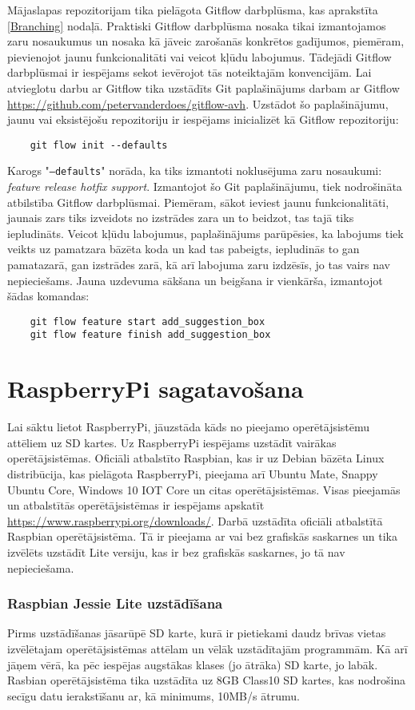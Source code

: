 Mājaslapas repozitorijam tika pielāgota Gitflow darbplūsma, kas aprakstīta \ref{Branching} nodaļā. Praktiski Gitflow darbplūsma nosaka tikai izmantojamos zaru nosaukumus un nosaka kā jāveic zarošanās konkrētos gadījumos, piemēram, pievienojot jaunu funkcionalitāti vai veicot kļūdu labojumus. Tādejādi Gitflow darbplūsmai ir iespējams sekot ievērojot tās noteiktajām konvencijām. Lai atvieglotu darbu ar Gitflow tika uzstādīts Git paplašinājums darbam ar Gitflow \url{https://github.com/petervanderdoes/gitflow-avh}. Uzstādot šo paplašinājumu, jaunu vai eksistējošu repozitoriju ir iespējams inicializēt kā Gitflow repozitoriju:
\begin{lstlisting}
	git flow init --defaults
\end{lstlisting}
Karogs "\texttt{--defaults}" norāda, ka tiks izmantoti noklusējuma zaru nosaukumi: \textit{feature release hotfix support}. Izmantojot šo Git paplašinājumu, tiek nodrošināta atbilstība Gitflow darbplūsmai. Piemēram, sākot ieviest jaunu funkcionalitāti, jaunais zars tiks izveidots no izstrādes zara un to beidzot, tas tajā tiks iepludināts. Veicot kļūdu labojumus, paplašinājums parūpēsies, ka labojums tiek veikts uz pamatzara bāzēta koda un kad tas pabeigts, iepludinās to gan pamatazarā, gan izstrādes zarā, kā arī labojuma zaru izdzēsīs, jo tas vairs nav nepieciešams. Jauna uzdevuma sākšana un beigšana ir vienkārša, izmantojot šādas komandas:
\begin{lstlisting}
	git flow feature start add_suggestion_box
	git flow feature finish add_suggestion_box
\end{lstlisting}

\section{RaspberryPi sagatavošana}
Lai sāktu lietot RaspberryPi, jāuzstāda kāds no pieejamo operētājsistēmu attēliem uz SD kartes. Uz RaspberryPi iespējams uzstādīt vairākas operētājsistēmas. Oficiāli atbalstīto Raspbian, kas ir uz Debian bāzēta Linux distribūcija, kas pielāgota RaspberryPi, pieejama arī Ubuntu Mate, Snappy Ubuntu Core, Windows 10 IOT Core un citas operētājsistēmas. Visas pieejamās un atbalstītās operētājsistēmas ir iespējams apskatīt \url{https://www.raspberrypi.org/downloads/}.
Darbā uzstādīta oficiāli atbalstītā Raspbian operētājsistēma. Tā ir pieejama ar vai bez grafiskās saskarnes un tika izvēlēts uzstādīt Lite versiju, kas ir bez grafiskās saskarnes, jo tā nav nepieciešama.

\subsubsection{Raspbian Jessie Lite uzstādīšana}
Pirms uzstādīšanas jāsarūpē SD karte, kurā ir pietiekami daudz brīvas vietas izvēlētajam operētājsistēmas attēlam un vēlāk uzstādītajām programmām. Kā arī jāņem vērā, ka pēc iespējas augstākas klases (jo ātrāka) SD karte, jo labāk. Rasbian operētājsistēma tika uzstādīta uz 8GB Class10 SD kartes, kas nodrošina secīgu datu ierakstīšanu ar, kā minimums, 10MB/s ātrumu.

